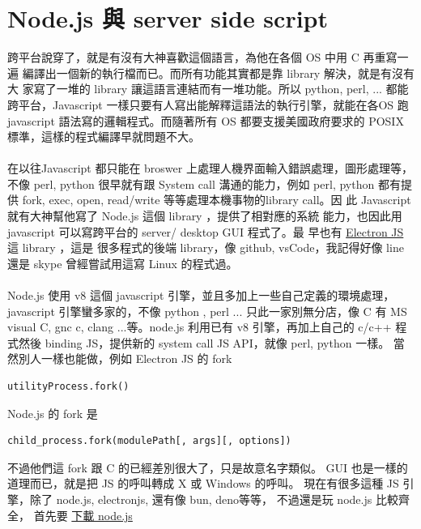 \section{Node.js 與 server side script}
跨平台說穿了，就是有沒有大神喜歡這個語言，為他在各個 OS 中用 C 再重寫一遍
編譯出一個新的執行檔而已。而所有功能其實都是靠 library 解決，就是有沒有大
家寫了一堆的 library 讓這語言連結而有一堆功能。所以 python, perl, ...
都能跨平台，Javascript 一樣只要有人寫出能解釋這語法的執行引擎，就能在各OS
跑 javascript 語法寫的邏輯程式。而隨著所有 OS 都要支援美國政府要求的 POSIX
標準，這樣的程式編譯早就問題不大。
\\\\
在以往Javascript 都只能在 broswer 上處理人機界面輸入錯誤處理，圖形處理等，
不像 perl, python 很早就有跟 System call 溝通的能力，例如 perl, python
都有提供 fork, exec, open, read/write 等等處理本機事物的library call。因
此 Javascript 就有大神幫他寫了 Node.js 這個 library ，提供了相對應的系統
能力，也因此用 javascript 可以寫跨平台的 server/ desktop GUI 程式了。最
早也有 \href{https://www.electronjs.org/}{Electron JS} 這 library ，這是
很多程式的後端 library，像 github, vsCode，我記得好像 line 還是 skype 
曾經嘗試用這寫 Linux 的程式過。
\\\\
Node.js 使用 v8 這個 javascript 引擎，並且多加上一些自己定義的環境處理，
javascript 引擎蠻多家的，不像 python , perl ... 只此一家別無分店，像 C 有
MS visual C, gnc c, clang ...等。node.js 利用已有 v8 引擎，再加上自己的 c/c++
程式然後 binding JS，提供新的 system call JS API，就像 perl, python 一樣。
當然別人一樣也能做，例如 Electron JS 的 fork
\begin{verbatim}
utilityProcess.fork()
\end{verbatim}
Node.js 的 fork 是
\begin{verbatim}
child_process.fork(modulePath[, args][, options])
\end{verbatim}
不過他們這 fork 跟 C 的已經差別很大了，只是故意名字類似。
GUI 也是一樣的道理而已，就是把 JS 的呼叫轉成 X 或 Windows 的呼叫。
現在有很多這種 JS 引擎，除了 node.js, electronjs, 還有像 bun, deno等等，
不過還是玩 node.js 比較齊全，
首先要 \href{https://nodejs.org/en/download}{下載 node.js}

